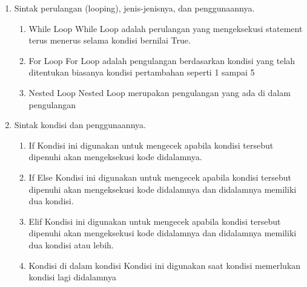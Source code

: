 \begin{enumerate}
\item Sintak perulangan (looping), jenis-jenisnya, dan penggunaannya.
\begin{enumerate}
\item While Loop
While Loop adalah perulangan yang mengeksekusi statement terus menerus selama kondisi bernilai True.


\item For Loop
For Loop  adalah pengulangan berdasarkan kondisi yang telah ditentukan biasanya kondisi pertambahan seperti 1 sampai 5


\item Nested Loop
Nested Loop merupakan pengulangan yang ada di dalam pengulangan


\end{enumerate}

\item Sintak kondisi dan penggunaannya.
\begin{enumerate}
\item If
Kondisi ini digunakan untuk mengecek apabila kondisi tersebut dipenuhi akan mengeksekusi kode didalamnya.


\item If Else
Kondisi ini digunakan untuk mengecek apabila kondisi tersebut dipenuhi akan mengeksekusi kode didalamnya dan didalamnya memiliki dua kondisi.


\item Elif
Kondisi ini digunakan untuk mengecek apabila kondisi tersebut dipenuhi akan mengeksekusi kode didalamnya dan didalamnya memiliki dua kondisi atau lebih.


\item Kondisi di dalam kondisi
Kondisi ini digunakan saat kondisi memerlukan kondisi lagi didalamnya


\end{enumerate}


\end{enumerate}
